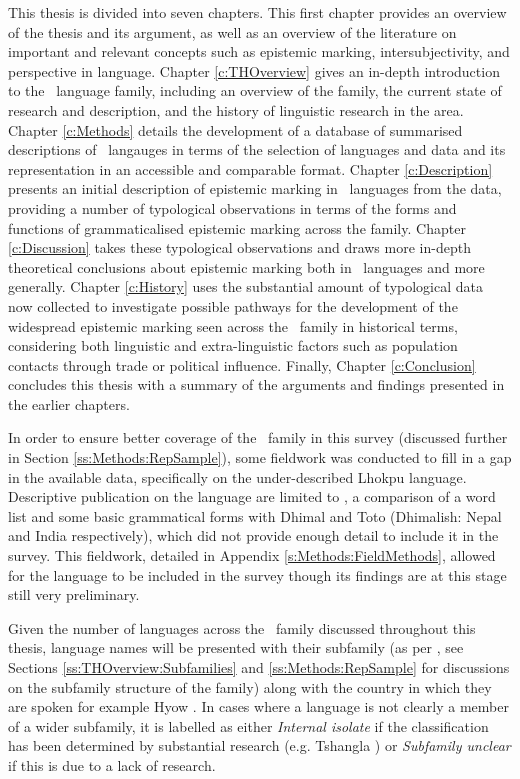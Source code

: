 This thesis is divided into seven chapters. This first chapter provides an overview of the thesis and its argument, as well as an overview of the literature on important and relevant concepts such as epistemic marking, intersubjectivity, and perspective in language. Chapter \ref{c:THOverview} gives an in-depth introduction to the \lfam\ language family, including an overview of the family, the current state of research and description, and the history of linguistic research in the area. Chapter \ref{c:Methods} details the development of a database of summarised descriptions of \lfam\ langauges in terms of the selection of languages and data and its representation in an accessible and comparable format. Chapter \ref{c:Description} presents an initial description of epistemic marking in \lfam\ languages from the data, providing a number of typological observations in terms of the forms and functions of grammaticalised epistemic marking across the family. Chapter \ref{c:Discussion} takes these typological observations and draws more in-depth theoretical conclusions about epistemic marking both in \lfam\ languages and more generally. Chapter \ref{c:History} uses the substantial amount of typological data now collected to investigate possible pathways for the development of the widespread epistemic marking seen across the \lfam\ family in historical terms, considering both linguistic and extra-linguistic factors such as population contacts through trade or political influence. Finally, Chapter \ref{c:Conclusion} concludes this thesis with a summary of the arguments and findings presented in the earlier chapters.

In order to ensure better coverage of the \lfam\ family in this survey (discussed further in Section \ref{ss:Methods:RepSample}), some fieldwork was conducted to fill in a gap in the available data, specifically on the under-described Lhokpu language. Descriptive publication on the language are limited to , a comparison of a word list and some basic grammatical forms with Dhimal and Toto (Dhimalish: Nepal and India respectively), which did not provide enough detail to include it in the survey. This fieldwork, detailed in Appendix \ref{s:Methods:FieldMethods}, allowed for the language to be included in the survey though its findings are at this stage still very preliminary.  

Given the number of languages across the \lfam\ family discussed throughout this thesis, language names will be presented with their subfamily (as per , see Sections \ref{ss:THOverview:Subfamilies} and \ref{ss:Methods:RepSample} for discussions on the subfamily structure of the family) along with the country in which they are spoken for example Hyow \cite[Kukish: Myanmar,][]{Zakaria2018}. In cases where a language is not clearly a member of a wider subfamily, it is labelled as either \textit{Internal isolate} if the classification has been determined by substantial research (e.g. Tshangla \cite[Internal isolate: Bhutan,][]{Grollmann2020}) or \textit{Subfamily unclear} if this is due to a lack of research.


